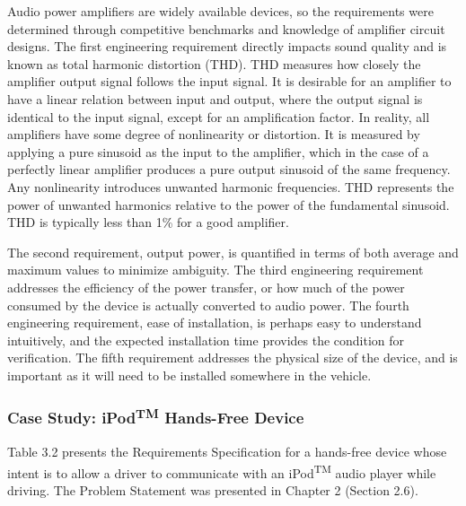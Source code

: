 Audio power amplifiers are widely available devices, so the requirements
were determined through competitive benchmarks and knowledge of
amplifier circuit designs. The first engineering requirement directly
impacts sound quality and is known as total harmonic distortion (THD).
THD measures how closely the amplifier output signal follows the input
signal. It is desirable for an amplifier to have a linear relation
between input and output, where the output signal is identical to the
input signal, except for an amplification factor. In reality, all
amplifiers have some degree of nonlinearity or distortion. It is
measured by applying a pure sinusoid as the input to the amplifier,
which in the case of a perfectly linear amplifier produces a pure output
sinusoid of the same frequency. Any nonlinearity introduces unwanted
harmonic frequencies. THD represents the power of unwanted harmonics
relative to the power of the fundamental sinusoid. THD is typically less
than 1\% for a good amplifier.

The second requirement, output power, is quantified in terms of both
average and maximum values to minimize ambiguity. The third engineering
requirement addresses the efficiency of the power transfer, or how much
of the power consumed by the device is actually converted to audio
power. The fourth engineering requirement, ease of installation, is
perhaps easy to understand intuitively, and the expected installation
time provides the condition for verification. The fifth requirement
addresses the physical size of the device, and is important as it will
need to be installed somewhere in the vehicle.

\subsubsection{Case Study: iPod\textsuperscript{TM} Hands-Free Device}
\label{subsection:case-study-ipodtm-hands-free-device}

Table 3.2 presents the Requirements Specification for a hands-free
device whose intent is to allow a driver to communicate with an
iPod\textsuperscript{TM} audio player while driving. The Problem
Statement was presented in Chapter 2 (Section 2.6).

